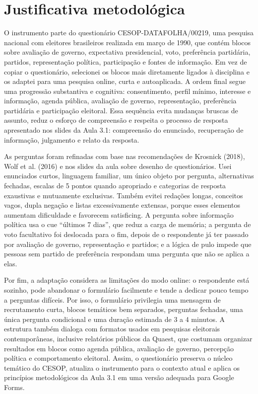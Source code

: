 \documentclass[11pt,a4paper]{article}
\begin{document}
\section*{Justificativa metodológica}

O instrumento parte do questionário CESOP-DATAFOLHA/00219, uma pesquisa nacional com eleitores brasileiros realizada em março de 1990, que contém blocos sobre avaliação de governo, expectativa presidencial, voto, preferência partidária, partidos, representação política, participação e fontes de informação. Em vez de copiar o questionário, selecionei os blocos mais diretamente ligados à disciplina e os adaptei para uma pesquisa online, curta e autoaplicada. A ordem final segue uma progressão substantiva e cognitiva: consentimento, perfil mínimo, interesse e informação, agenda pública, avaliação de governo, representação, preferência partidária e participação eleitoral. Essa sequência evita mudanças bruscas de assunto, reduz o esforço de compreensão e respeita o processo de resposta apresentado nos slides da Aula 3.1: compreensão do enunciado, recuperação de informação, julgamento e relato da resposta.

As perguntas foram refinadas com base nas recomendações de Krosnick (2018), Wolf et al. (2016) e nos slides da aula sobre desenho de questionários. Usei enunciados curtos, linguagem familiar, um único objeto por pergunta, alternativas fechadas, escalas de 5 pontos quando apropriado e categorias de resposta exaustivas e mutuamente exclusivas. Também evitei redações longas, conceitos vagos, dupla negação e listas excessivamente extensas, porque esses elementos aumentam dificuldade e favorecem satisficing. A pergunta sobre informação política usa o cue ``últimos 7 dias'', que reduz a carga de memória; a pergunta de voto facultativo foi deslocada para o fim, depois de o respondente já ter passado por avaliação de governo, representação e partidos; e a lógica de pulo impede que pessoas sem partido de preferência respondam uma pergunta que não se aplica a elas.

Por fim, a adaptação considera as limitações do modo online: o respondente está sozinho, pode abandonar o formulário facilmente e tende a dedicar pouco tempo a perguntas difíceis. Por isso, o formulário privilegia uma mensagem de recrutamento curta, blocos temáticos bem separados, perguntas fechadas, uma única pergunta condicional e uma duração estimada de 3 a 4 minutos. A estrutura também dialoga com formatos usados em pesquisas eleitorais contemporâneas, inclusive relatórios públicos da Quaest, que costumam organizar resultados em blocos como agenda pública, avaliação de governo, percepção política e comportamento eleitoral. Assim, o questionário preserva o núcleo temático do CESOP, atualiza o instrumento para o contexto atual e aplica os princípios metodológicos da Aula 3.1 em uma versão adequada para Google Forms.
\end{document}

